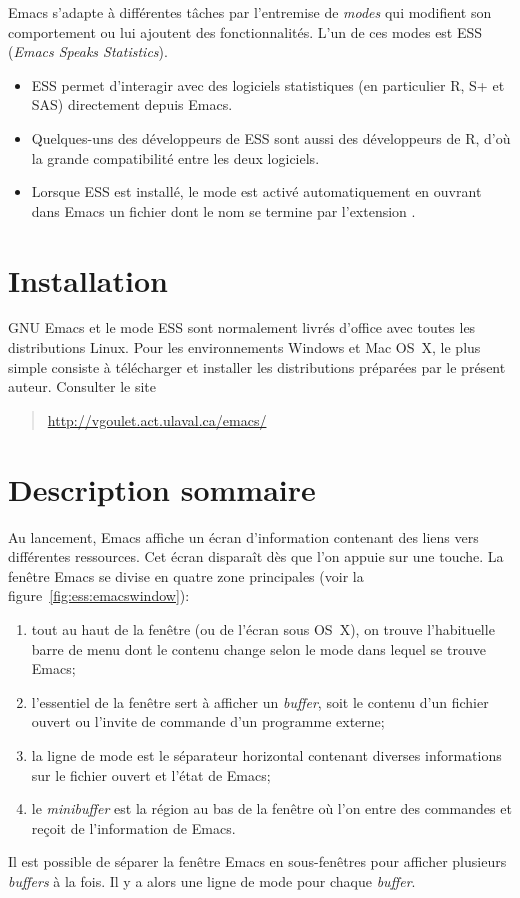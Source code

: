 Emacs s'adapte à différentes tâches par l'entremise de \emph{modes}
qui modifient son comportement ou lui ajoutent des fonctionnalités.
L'un de ces modes est ESS (\emph{Emacs Speaks Statistics}).
\begin{itemize}
\item ESS permet d'interagir avec des logiciels statistiques (en
  particulier R, S+ et SAS) directement depuis Emacs.
\item Quelques-uns des développeurs de ESS sont aussi des développeurs
  de R, d'où la grande compatibilité entre les deux logiciels.
\item Lorsque ESS est installé, le mode est activé automatiquement en
  ouvrant dans Emacs un fichier dont le nom se termine par l'extension
  .
\end{itemize}


\section{Installation}
\label{emacs+ess:installation}

GNU Emacs et le mode ESS sont normalement livrés d'office avec toutes
les distributions Linux. Pour les environnements Windows et Mac OS~X,
le plus simple consiste à télécharger et installer les distributions
préparées par le présent auteur. Consulter le site
\begin{quote}
  \url{http://vgoulet.act.ulaval.ca/emacs/}
\end{quote}


\section{Description sommaire}
\label{emacs+ess:description}

Au lancement, Emacs affiche un écran d'information contenant des liens
vers différentes ressources. Cet écran disparaît dès que l'on appuie
sur une touche. La fenêtre Emacs se divise en quatre zone principales
(voir la figure~\ref{fig:ess:emacswindow}):
\begin{enumerate}
\item tout au haut de la fenêtre (ou de l'écran sous OS~X), on trouve
  l'habituelle barre de menu dont le contenu change selon le mode dans
  lequel se trouve Emacs;
\item l'essentiel de la fenêtre sert à afficher un \emph{buffer}, soit
  le contenu d'un fichier ouvert ou l'invite de commande d'un
  programme externe;
\item la ligne de mode est le séparateur horizontal contenant diverses
  informations sur le fichier ouvert et l'état de Emacs;
\item le \emph{minibuffer} est la région au bas de la fenêtre où l'on
  entre des commandes et reçoit de l'information de Emacs.
\end{enumerate}
Il est possible de séparer la fenêtre Emacs en sous-fenêtres pour
afficher plusieurs \emph{buffers} à la fois. Il y a alors une ligne de
mode pour chaque \emph{buffer}.

